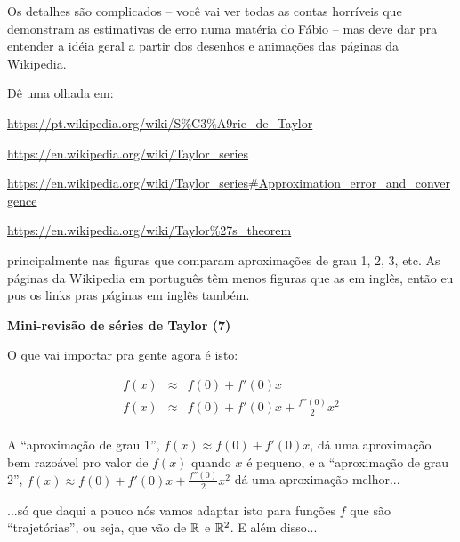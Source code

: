 \documentclass[oneside,12pt]{article}
\begin{document}
Os detalhes são  complicados -- você vai ver todas as
contas horríveis que demonstram as estimativas de erro numa matéria do
Fábio -- mas deve dar pra entender a idéia geral a partir dos desenhos
e animações das páginas da Wikipedia.

Dê uma olhada em:

\ssk

\url{https://pt.wikipedia.org/wiki/S\%C3\%A9rie_de_Taylor}

\url{https://en.wikipedia.org/wiki/Taylor_series}

\url{https://en.wikipedia.org/wiki/Taylor_series\#Approximation_error_and_convergence}

\url{https://en.wikipedia.org/wiki/Taylor\%27s_theorem}

\ssk

principalmente nas figuras que comparam aproximações de grau 1, 2, 3,
etc. As páginas da Wikipedia em português têm menos figuras que as em
inglês, então eu pus os links pras páginas em inglês também.




\newpage


{\bf Mini-revisão de séries de Taylor (7)}

\ssk

O que vai importar pra gente agora é isto:

$$\begin{array}{rcl}
  f(x) &≈& f(0) + f'(0)x \\
  f(x) &≈& f(0) + f'(0)x + \frac{f''(0)}{2} x^2 \\[5pt]
  \end{array}
$$

A ``aproximação de grau 1'', $f(x) ≈ f(0) + f'(0)x$, dá uma
aproximação bem razoável pro valor de $f(x)$ quando $x$ é pequeno, e a
``aproximação de grau 2'', $f(x) ≈ f(0) + f'(0)x + \frac{f''(0)}{2}
x^2$ dá uma aproximação melhor...

...só que daqui a pouco nós vamos adaptar isto para funções $f$ que
são ``trajetórias'', ou seja, que vão de $\mathbb{R}$ e $\mathbb{R}^2$. E além disso...



\newpage
\end{document}
